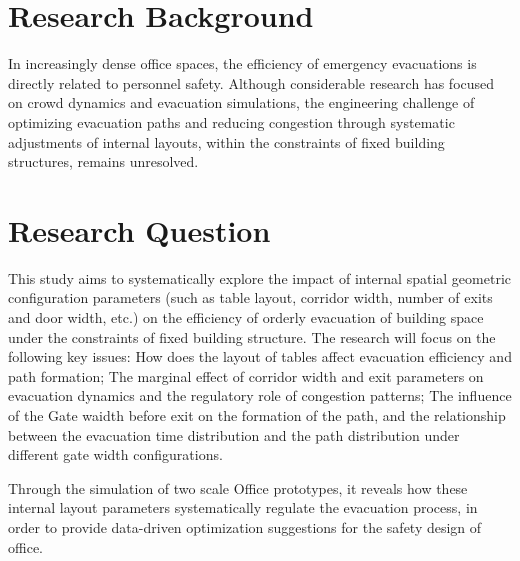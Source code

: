 \section{Research Background}
In increasingly dense office spaces, the efficiency of emergency evacuations is directly related to personnel safety. Although considerable research has focused on crowd dynamics and evacuation simulations, the engineering challenge of optimizing evacuation paths and reducing congestion through systematic adjustments of internal layouts, within the constraints of fixed building structures, remains unresolved. 

\section{Research Question}
This study aims to systematically explore the impact of internal spatial geometric configuration parameters (such as table layout, corridor width, number of exits and door width, etc.) on the efficiency of orderly evacuation of building space under the constraints of fixed building structure. The research will focus on the following key issues: How does the layout of tables affect evacuation efficiency and path formation; The marginal effect of corridor width and exit parameters on evacuation dynamics and the regulatory role of congestion patterns; The influence of the Gate waidth before exit on the formation of the path, and the relationship between the evacuation time distribution and the path distribution under different gate width configurations. 

Through the simulation of two scale Office prototypes, it reveals how these internal layout parameters systematically regulate the evacuation process, in order to provide data-driven optimization suggestions for the safety design of office.


